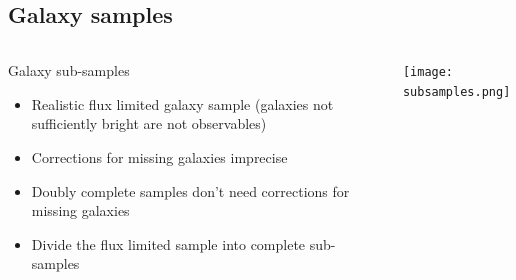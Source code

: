 \subsection{Galaxy samples}
\begin{frame}
    \begin{columns}
        \begin{column}{0.5\textwidth}
            \begin{minipage}[c][\textheight][c]{\linewidth}
                \begin{block}{Galaxy sub-samples}
                    \begin{itemize}
                        \item<1-> Realistic flux limited galaxy sample
                            (galaxies not sufficiently bright are not
                            observables)
                        \item<2-> Corrections for missing galaxies imprecise
                        \item<3-> Doubly complete samples don't need
                            corrections for missing galaxies
                        \item<4-> Divide the flux limited sample into complete
                            sub-samples
                    \end{itemize}
                \end{block}
            \end{minipage}
        \end{column}
        \begin{column}{0.5\textwidth}
            \begin{minipage}[c][\textheight][c]{\linewidth}
                \texttt{[image: subsamples.png]}
            \end{minipage}
        \end{column}
    \end{columns}
\end{frame}

